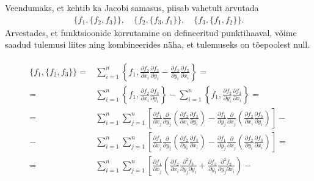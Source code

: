 Veendumaks, et kehtib ka Jacobi samasus, piisab vahetult arvutada
\begin{align*}
    \{f_1, \{f_2, f_3\}\}, \quad
    \{f_2, \{f_3, f_1\}\}, \quad
    \{f_3, \{f_1, f_2\}\}.
\end{align*}
Arvestades, et funktsioonide korrutamine
on defineeritud punktihaaval, võime saadud tulemusi liites ning kombineerides näha, et tulemuseks
on tõepoolest null.

\begin{align}\begin{split}
    \{f_1, \{f_2, f_3\}\} = &\sum_{i=1}^{n} \left\{
        f_1,
        \frac{\partial f_2}{\partial x_i}
        \frac{\partial f_3}{\partial y_i} -
        \frac{\partial f_2}{\partial y_i}
        \frac{\partial f_3}{\partial x_i}
    \right\} = \\
    = &\sum_{i=1}^{n} \left\{
        f_1,
        \frac{\partial f_2}{\partial x_i}
        \frac{\partial f_3}{\partial y_i}
    \right\} - \sum_{i=1}^{n} \left\{
        f_1,
        \frac{\partial f_2}{\partial y_i}
        \frac{\partial f_3}{\partial x_i}
    \right\} = \\
    = &\sum_{i=1}^{n} \sum_{j=1}^{n} \left[
        \frac{\partial f_1}{\partial x_j}
        \frac{\partial}{\partial y_j} \left(
            \frac{\partial f_2}{\partial x_i}
            \frac{\partial f_3}{\partial y_i}
        \right) -
        \frac{\partial f_1}{\partial y_j}
        \frac{\partial}{\partial x_j} \left(
            \frac{\partial f_2}{\partial x_i}
            \frac{\partial f_3}{\partial y_i}
        \right)
    \right] - \\
    - &\sum_{i=1}^{n} \sum_{j=1}^{n} \left[
        \frac{\partial f_1}{\partial x_j}
        \frac{\partial}{\partial y_j} \left(
            \frac{\partial f_2}{\partial y_i}
            \frac{\partial f_3}{\partial x_i}
        \right) -
        \frac{\partial f_1}{\partial y_j}
        \frac{\partial}{\partial x_j} \left(
            \frac{\partial f_2}{\partial y_i}
            \frac{\partial f_3}{\partial x_i}
        \right)
    \right] = \\
    = &\sum_{i=1}^{n} \sum_{j=1}^{n} \left[
        \frac{\partial f_1}{\partial x_j}\left(
            \frac{\partial f_2}{\partial x_i}
            \frac{\partial^2 f_3}{\partial y_j \partial y_i} +
            \frac{\partial f_3}{\partial y_i}
            \frac{\partial^2 f_2}{\partial y_j \partial x_i}
        \right) - \right.\\
        &\phantom{\sum_{i=1}^{n} \sum_{j=1}^{n} [}\ \ 

\end{split}
\end{align}
